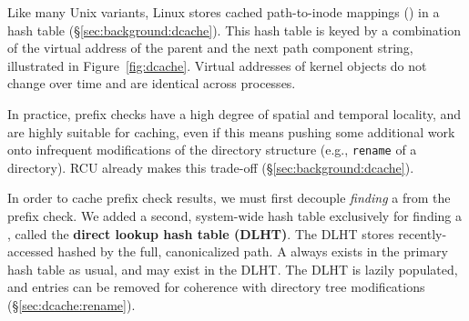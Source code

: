 Like many Unix variants, Linux stores cached path-to-inode mappings (\dentries{}) in a hash
table (\S\ref{sec:background:dcache}).  This hash table is keyed by a combination of 
the virtual address of the parent \dentry{} and the next path component string, illustrated in
Figure~\ref{fig:dcache}.  
Virtual addresses of kernel objects do not change over time and are identical across processes.

In practice, prefix checks have a high degree of spatial and temporal locality,
and are highly suitable for caching,
even if this 
means pushing some additional work onto infrequent modifications of the directory structure (e.g., {\tt rename} of a directory).
RCU already makes this trade-off (\S\ref{sec:background:dcache}).





In order to cache prefix check results, we must first decouple 
{\em finding} a \dentry{} from the prefix check.
We added a second, system-wide hash table exclusively for finding a \dentry{}, called the {\bf direct lookup hash table (DLHT)}.
The DLHT stores recently-accessed \dentries{}
hashed
by the full, canonicalized path.
A \dentry{} always exists in the primary hash table as usual,
and may exist in the DLHT.
The DLHT is lazily populated, and entries can be removed for coherence
with directory tree modifications (\S\ref{sec:dcache:rename}).

